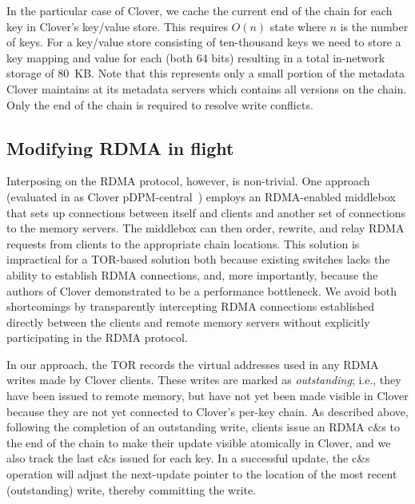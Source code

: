 

In the particular case of Clover, we cache the current end of the
chain for each key in Clover's key/value store. This requires $O(n)$
state where $n$ is the number of keys. For a key/value store
consisting of ten-thousand keys we need to store a key mapping and
value for each (both 64 bits) resulting in a total in-network storage
of 80~KB.  Note that this represents only a small portion of the
metadata Clover maintains at its metadata servers which contains all
versions on the chain. Only the end of the chain is required to
resolve write conflicts.


\subsection{Modifying RDMA in flight}

Interposing on the RDMA protocol, however, is non-trivial. One
approach (evaluated in as Clover pDPM-central~\cite{clover}) employs
an RDMA-enabled middlebox that sets up connections between itself and
clients and another set of connections to the memory servers.  The
middlebox can then order, rewrite, and relay RDMA requests from
clients to the appropriate chain locations. This solution is
impractical for a TOR-based solution both because existing switches
lacks the ability to establish RDMA connections, and, more
importantly, because the authors of Clover demonstrated to be a
performance bottleneck.  We avoid both shortcomings by transparently
intercepting RDMA connections established directly between the clients
and remote memory servers without explicitly participating in the RDMA
protocol.

In our approach, the TOR records the virtual addresses used in any
RDMA writes made by Clover clients. These writes are marked as
\textit{outstanding}; i.e., they have been issued to remote memory,
but have not yet been made visible in Clover because they are not yet
connected to Clover's per-key chain.  As described above, following
the completion of an outstanding write, clients issue an RDMA c\&s to
the end of the chain to make their update visible atomically in
Clover, and we also track the last c\&s issued for each key.  In a
successful update, the c\&s operation will adjust the next-update
pointer to the location of the most recent (outstanding) write,
thereby committing the write.

